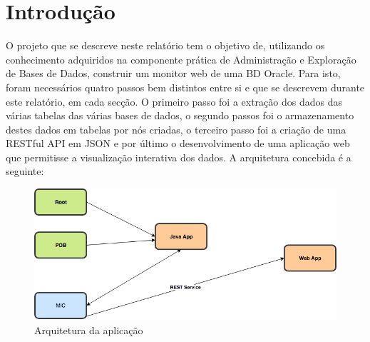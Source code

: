 \section{Introdução}\label{sec:Introduction}

O projeto que se descreve neste relatório tem o objetivo de, utilizando os conhecimento adquiridos na componente prática de Administração e Exploração de Bases de Dados, construir um monitor web de uma BD Oracle. Para isto, foram necessários quatro passos bem distintos entre si e que se descrevem durante este relatório, em cada secção. O primeiro passo foi a extração dos dados das várias tabelas das várias bases de dados, o segundo passos foi o armazenamento destes dados em tabelas por nós criadas, o terceiro passo foi a criação de uma RESTful API em JSON e por último o desenvolvimento de uma aplicação web que permitisse a visualização interativa dos dados. A arquitetura concebida é a seguinte:
\vspace{5mm}
\begin{figure}[H]
    \centering
    \includegraphics[scale=0.6]{tex/img/aebd.png}
    \caption{Arquitetura da aplicação}
    \label{fig:aa}
\end{figure}
